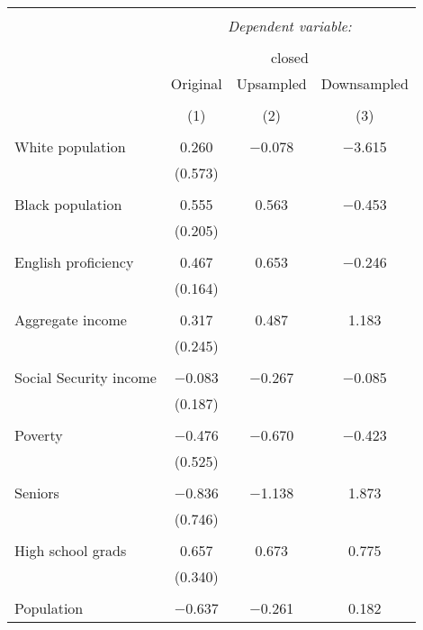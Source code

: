 
\begin{table}[!htbp] \centering 
  \caption{} 
  \label{} 
\begin{tabular}{@{\extracolsep{5pt}}lccc} 
\\[-1.8ex]\hline 
\hline \\[-1.8ex] 
 & \multicolumn{3}{c}{\textit{Dependent variable:}} \\ 
\cline{2-4} 
\\[-1.8ex] & \multicolumn{3}{c}{closed} \\ 
 & Original & Upsampled & Downsampled \\ 
\\[-1.8ex] & (1) & (2) & (3)\\ 
\hline \\[-1.8ex] 
 White population & 0.260 & $-$0.078 & $-$3.615 \\ 
  & (0.573) &  &  \\ 
  & & & \\ 
 Black population & 0.555 & 0.563 & $-$0.453 \\ 
  & (0.205) &  &  \\ 
  & & & \\ 
 English proficiency & 0.467 & 0.653 & $-$0.246 \\ 
  & (0.164) &  &  \\ 
  & & & \\ 
 Aggregate income & 0.317 & 0.487 & 1.183 \\ 
  & (0.245) &  &  \\ 
  & & & \\ 
 Social Security income & $-$0.083 & $-$0.267 & $-$0.085 \\ 
  & (0.187) &  &  \\ 
  & & & \\ 
 Poverty & $-$0.476 & $-$0.670 & $-$0.423 \\ 
  & (0.525) &  &  \\ 
  & & & \\ 
 Seniors & $-$0.836 & $-$1.138 & 1.873 \\ 
  & (0.746) &  &  \\ 
  & & & \\ 
 High school grads & 0.657 & 0.673 & 0.775 \\ 
  & (0.340) &  &  \\ 
  & & & \\ 
 Population & $-$0.637 & $-$0.261 & 0.182 \\ 

\end{tabular}
\end{table}
